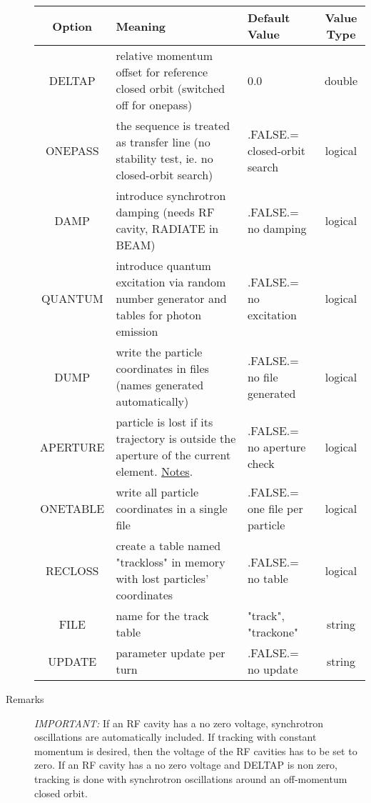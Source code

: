 \begin{description}
          \begin{tabular}{c p{5cm} p{3cm} c}
            \hline 
            \textbf{Option} & \textbf{Meaning} & \textbf{Default Value} & \textbf{Value Type} \\ 
            \hline
            DELTAP & relative momentum offset for reference closed orbit (switched off for onepass) &  0.0 & double \\ 
            \hline
            ONEPASS & the sequence is treated as transfer line (no stability test, ie. no closed-orbit search) & .FALSE.= closed-orbit search & logical \\ 
            \hline
            DAMP & introduce synchrotron damping (needs RF cavity, RADIATE in BEAM)  & .FALSE.= no damping & logical \\ 
            \hline
            QUANTUM & introduce quantum excitation via random number generator and tables for photon emission & .FALSE.= no excitation & logical \\ 
            \hline
            DUMP & write the particle coordinates in files (names generated automatically)  & .FALSE.= no file generated & logical \\ 
            \hline
            APERTURE & particle is lost if its trajectory is outside the aperture of the current element. \hyperlink{track:remarks:aperture:notes}{Notes}. & .FALSE.= no aperture check & logical \\ 
            \hline
            ONETABLE & write all particle coordinates in a single file & .FALSE.= one file per particle & logical \\ 
            \hline
            RECLOSS & create a table named "trackloss" in memory with lost particles' coordinates & .FALSE.= no table & logical \\ 
            \hline
            FILE & name for the track table   & "track", "trackone" & string \\ 
            \hline
            UPDATE & parameter update per turn   & .FALSE.= no update & string \\ 
            \hline
          \end{tabular}
          
	\item[Remarks] \emph{IMPORTANT:} If an RF cavity has a no zero voltage, synchrotron
          oscillations are automatically included. If tracking with constant
          momentum is desired, then the voltage of the RF cavities has to be set
          to zero. If an RF cavity has a no zero voltage and DELTAP is non zero, 
          tracking is done with synchrotron oscillations around an off-momentum
          closed orbit.
          

\end{description}
